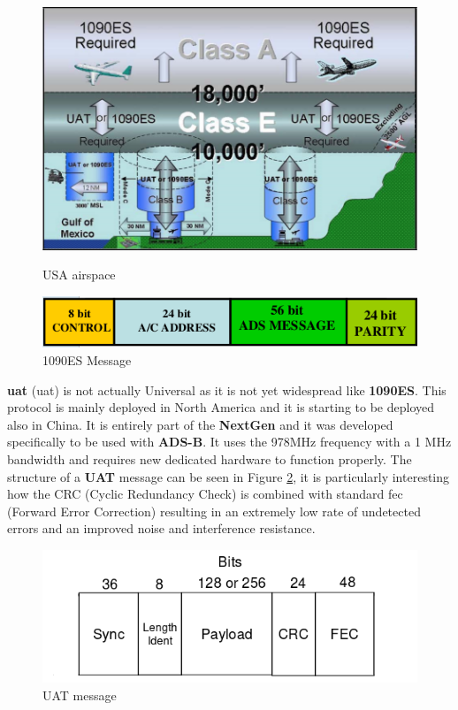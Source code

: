 \documentclass[../main.tex]{subfiles}
\begin{document}
\begin{figure}[htp]
\centering
\begin{minipage}{.5\textwidth}
  \centering
  \includegraphics[scale=0.35]{images/uatvs1090.png}
  \caption{USA airspace}
  \label{fig:uatvs1090}
\end{minipage}%
\begin{minipage}{.5\textwidth}
  \centering
  \includegraphics[scale=0.45]{images/1090es.png}
  \caption{1090ES Message}
  \label{fig:1090es}
\end{minipage}
\end{figure}

\textbf{\acrshort{uat}} (\acrlong{uat}) is not actually Universal as it is not yet widespread like \textbf{1090ES}. This protocol is mainly deployed in North America and it is starting to be deployed also in China. It is entirely part of the \textbf{NextGen} and it was developed specifically to be used with \textbf{ADS-B}. It uses the 978MHz frequency with a 1 MHz bandwidth and requires new dedicated hardware to function properly. The structure of a \textbf{UAT} message can be seen in Figure \ref{fig:uatmsg}, it is particularly interesting how the CRC (Cyclic Redundancy Check) is combined with standard \acrshort{fec} (Forward Error Correction) resulting in an extremely low rate of undetected errors and an improved noise and interference resistance.

\begin{figure}[htp]
  \centering
  \includegraphics[scale=0.8]{images/uatmsg.png}
  \caption{UAT message}
  \label{fig:uatmsg}
\end{figure}
\end{document}
